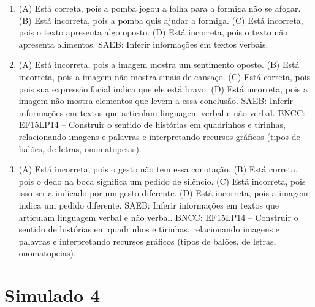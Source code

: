 \begin{enumerate}
\item
(A) Está correta, pois a pomba jogou a folha para a formiga não se afogar.
(B) Está incorreta, pois a pomba quis ajudar a formiga.
(C) Está incorreta, pois o texto apresenta algo oposto.
(D) Está incorreta, pois o texto não apresenta alimentos.
SAEB: Inferir informações em textos verbais.

\item
(A) Está incorreta, pois a imagem mostra um sentimento oposto.
(B) Está incorreta, pois a imagem não mostra sinais de cansaço.
(C) Está correta, pois pois sua expressão facial indica que ele está bravo.
(D) Está incorreta, pois a imagem não mostra elementos que levem a essa conclusão.
SAEB: Inferir informações em textos que articulam linguagem verbal e não verbal.
BNCC: EF15LP14 -- Construir o sentido de histórias em quadrinhos
e tirinhas, relacionando imagens e palavras e interpretando recursos
gráficos (tipos de balões, de letras, onomatopeias).

\item
(A) Está incorreta, pois o gesto não tem essa conotação.
(B) Está correta, pois o dedo na boca significa um pedido de silêncio.
(C) Está incorreta, pois isso seria indicado por um gesto diferente.
(D) Está incorreta, pois a imagem indica um pedido diferente.
SAEB: Inferir informações em textos que articulam linguagem
verbal e não verbal.
BNCC: EF15LP14 -- Construir o sentido de histórias em quadrinhos
e tirinhas, relacionando imagens e palavras e interpretando recursos
gráficos (tipos de balões, de letras, onomatopeias).
\end{enumerate}

\section*{Simulado 4}

